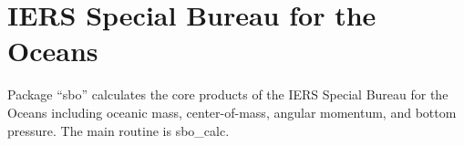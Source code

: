 
\chapter{IERS Special Bureau for the Oceans}
  
Package ``sbo'' calculates the core products of the IERS Special Bureau
for the Oceans including oceanic mass, center-of-mass, angular
momentum, and bottom pressure.  The main routine is sbo\_calc.
